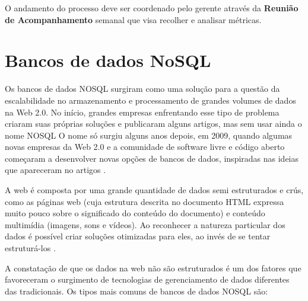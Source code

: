 \documentclass[a4paper,12pt]{monografia}
\begin{document}
O andamento do processo deve ser coordenado pelo gerente através da \textbf{Reunião de Acompanhamento} semanal que visa recolher e analisar métricas.

\section{Bancos de dados NoSQL} %
\label{sec:bancos_de_dados_nosql}
Os bancos de dados NOSQL surgiram como uma solução para a questão da escalabilidade no armazenamento e processamento de grandes volumes de dados na Web 2.0. No início, grandes empresas enfrentando esse tipo de problema criaram suas próprias soluções e publicaram alguns artigos, mas sem usar ainda o nome NOSQL O nome só surgiu alguns anos depois, em 2009, quando algumas novas empresas da Web 2.0 e a comunidade de software livre e código aberto começaram a desenvolver novas opções de bancos de dados, inspiradas nas ideias que apareceram no artigos \cite{de2010nosql}.

\begin{citacao}
A web é composta por uma grande quantidade de dados semi estruturados e crús, como as páginas web (cuja estrutura descrita no documento HTML expressa muito pouco sobre o significado do conteúdo do documento) e conteúdo multimídia (imagens, sons e vídeos). Ao reconhecer a natureza particular dos dados é possível criar soluções otimizadas para eles, ao invés de se tentar estruturá-los \cite{de2010nosql}.
\end{citacao}

A constatação de que os dados na web não são estruturados é um dos fatores que favoreceram o surgimento de tecnologias de gerenciamento de dados diferentes das tradicionais. Os tipos mais comuns de bancos de dados NOSQL são:
\end{document}
